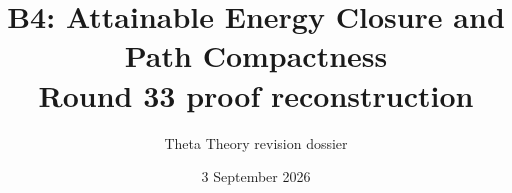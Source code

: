 \documentclass[11pt]{article}
\title{B4: Attainable Energy Closure and Path Compactness\\\large Round 33 proof reconstruction}
\author{Theta Theory revision dossier}
\date{3 September 2026}
\begin{document}
\maketitle
\reviewnote

\end{document}
